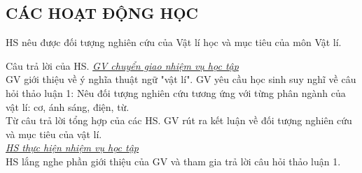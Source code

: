 \subsection{CÁC HOẠT ĐỘNG HỌC}
{HS nêu được đối tượng nghiên cứu của Vật lí học và mục tiêu của môn Vật lí.

}
{
Câu trả lời của HS.
}
{
\textit{\underline{GV chuyển giao nhiệm vụ học tập}}\\
GV giới thiệu về ý nghĩa thuật ngữ "vật lí". GV yêu cầu học sinh suy nghĩ về câu hỏi thảo luận 1: Nêu đối tượng nghiên cứu tương ứng với từng phân ngành của vật lí: cơ, ánh sáng, điện, từ.\\
Từ câu trả lời tổng hợp của các HS. GV rút ra kết luận về đối tượng nghiên cứu và mục tiêu của vật lí.\\
\textit{\underline{HS thực hiện nhiệm vụ học tập}}\\
HS lắng nghe phần giới thiệu của GV và tham gia trả lời câu hỏi thảo luận 1.
}

